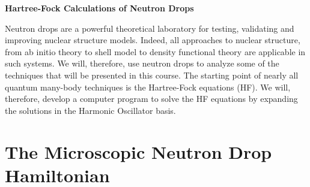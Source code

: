 \documentclass[letterpaper,11pt]{article}
\begin{document}
\begin{center}
{\large\bf Hartree-Fock Calculations of Neutron Drops} \bigskip\\

\parbox{0.9\textwidth}{\footnotesize
Neutron drops are a powerful theoretical laboratory for testing, validating and improving nuclear structure models. Indeed, all approaches to nuclear structure, from ab initio theory to shell model to density functional theory are applicable in such systems. We  will, therefore, use neutron drops to analyze some of the techniques that will be presented in this course. The starting point of nearly all quantum many-body techniques is the Hartree-Fock equations (HF). We will, therefore, develop a computer program to solve the HF equations by expanding the solutions in the Harmonic Oscillator basis.}

\end{center}


\section{The Microscopic Neutron Drop Hamiltonian}
\end{document}
